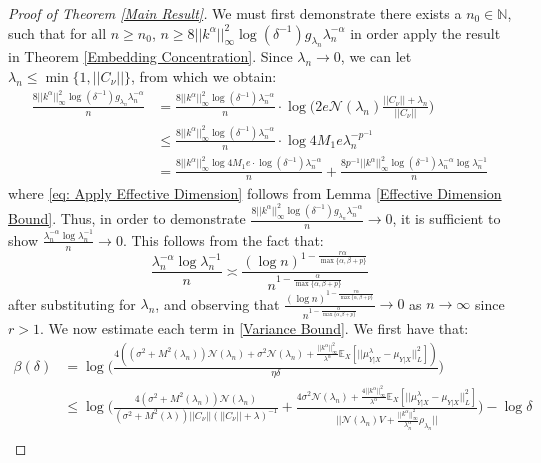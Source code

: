 \documentclass[accepted]{article}
\theoremstyle{definition}
\begin{document}
\begin{proof}[Proof of Theorem \ref{Main Result}]
We must first demonstrate there exists a $n_0 \in \mathbb{N}$, such that for all $n \geq n_0$, $n \geq 8||k^{\alpha}||^2_{\infty}\log(\delta^{-1}) g_{\lambda_n}\lambda_n^{-\alpha}$ in order apply the result in Theorem \ref{Embedding Concentration}. Since $\lambda_n \to 0$, we can let $\lambda_n \leq \min\{1, ||C_{\nu}||\}$, from which we obtain:
\begin{align}
    \frac{8||k^{\alpha}||^2_{\infty}\log(\delta^{-1}) g_{\lambda_n}\lambda_n^{-\alpha}}{n} & = \frac{8||k^{\alpha}||^2_{\infty}\log(\delta^{-1}) \lambda_n^{-\alpha}}{n} \cdot \log \Big(2e\mathcal{N}(\lambda_n)\frac{||C_{\nu}|| + \lambda_n}{||C_{\nu}||}\Big) \nonumber \\
    & \leq \frac{8||k^{\alpha}||^2_{\infty}\log(\delta^{-1}) \lambda_n^{-\alpha}}{n} \cdot \log 4M_1e\lambda_n^{-p^{-1}} \label{eq: Apply Effective Dimension}\\
    & = \frac{8||k^{\alpha}||^2_{\infty}\log 4M_1e \cdot \log(\delta^{-1}) \lambda_n^{-\alpha}}{n} + \frac{8p^{-1}||k^{\alpha}||^2_{\infty}\log(\delta^{-1}) \lambda_n^{-\alpha}\log \lambda^{-1}_n}{n} \nonumber
\end{align}
where \eqref{eq: Apply Effective Dimension} follows from Lemma \ref{Effective Dimension Bound}. Thus, in order to demonstrate $\frac{8||k^{\alpha}||^2_{\infty}\log(\delta^{-1}) g_{\lambda_n}\lambda_n^{-\alpha}}{n} \to 0$, it is sufficient to show $\frac{\lambda_n^{-\alpha}\log \lambda^{-1}_n}{n} \to 0$. This follows from the fact that:
\begin{equation*}
    \frac{\lambda_n^{-\alpha}\log \lambda^{-1}_n}{n} \asymp \frac{(\log n)^{1 -  \frac{r\alpha}{\max \{\alpha, \beta + p\}}}}{n^{1 -  \frac{\alpha}{\max \{\alpha, \beta + p\}}}}
\end{equation*}
after substituting for $\lambda_n$, and observing that $\frac{(\log n)^{1 -  \frac{r\alpha}{\max \{\alpha, \beta + p\}}}}{n^{1 -  \frac{\alpha}{\max \{\alpha, \beta + p\}}}} \to 0$ as $n \to \infty$ since $r > 1$. We now estimate each term in \eqref{Variance Bound}. We first have that:
\begin{align}
    \beta(\delta) & = \log \Big(\frac{4((\sigma^2 + M^2(\lambda_n))\mathcal{N}(\lambda_n) + \sigma^2 \mathcal{N}(\lambda_n) + \frac{||k^{\alpha}||^2_{\infty}}{\lambda^{\alpha}}\mathbb{E}_X[||\mu^{\lambda}_{Y|X} - \mu_{Y|X}||_L^2])}{\eta \delta}\Big) \nonumber \\
    & \leq \log \Big(\frac{4(\sigma^2 + M^2(\lambda_n))\mathcal{N}(\lambda_n)}{(\sigma^2 + M^2(\lambda))||C_{\nu}||(||C_{\nu}|| + \lambda)^{-1}} + \frac{4\sigma^2 \mathcal{N}(\lambda_n) + \frac{4||k^{\alpha}||^2_{\infty}}{\lambda^{\alpha}}\mathbb{E}_X[||\mu^{\lambda}_{Y|X} - \mu_{Y|X}||_L^2]}{||\mathcal{N}(\lambda_n)V + \frac{||k^{\alpha}||^2_{\infty}}{\lambda_n^{\alpha}}\rho_{\lambda_n}||}\Big) - \log \delta \label{eq: ED Sublinear} \\

\end{align}
\end{proof}
\end{document}
